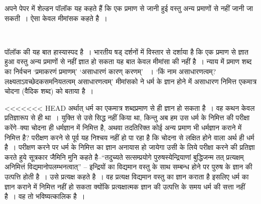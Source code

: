 अपने पेपर  में शेल्डन पॉलॉक यह कहते हैं कि एक प्रमाण से जानी हुई वस्तु अन्य प्रमाणों से नहीं जानी जा सकती~। ऐसा केवल मीमांसक कहते है~।

\begin{myquote}

~\hfill {}
\end{myquote}

पॉलॉक की यह बात हास्यास्पद है~। भारतीय षड् दर्शनों में विस्तार से दर्शाया है कि एक प्रमाण से ज्ञात हुआ वस्तु अन्य प्रमाणों से नहीं ज्ञात हो सकता यह बात केवल मीमांसा की नहीं है~। न्याय में प्रमाण शब्द का निर्वचन ‘प्रमाकरणं प्रमाणम्' ‘असाधारणं कारण् करणम्' ~। ‘किं नाम असाधारणत्वम्? लक्ष्यताऽवच्छेदकसमनियतत्वम् असाधारणत्वम्' मीमांसको ने धर्म के ज्ञान होने में असाधारण निमित्त एकमात्र चोदना (वैदिक शब्द) को बताया है~।

<<<<<<< HEAD
अर्थात् धर्म का एकमात्र शब्दप्रमाण से ही ज्ञान हो सकता है~। वह कथन केवल प्रतिज्ञारूप से ही था~। युक्ति से उसे सिद्ध नहीं किया था, किन्तु अब हम उस धर्म के निमित्त की परीक्षा करेंगे–क्या चोदना ही धर्मज्ञान में निमित्त है, अथवा तदतिरिक्त कोई अन्य प्रमाण भी धर्मज्ञान कराने में निमित्त है? परीक्षण करने से पूर्व यह निश्चय नहीं हो पा रहा है कि चोदना से लक्षित होने वाला अर्थ ही धर्म है~। परीक्षण करने पर धर्म के निमित्त का ज्ञान अनायास हो जायेगा उसी के लिये परीक्षा करने की प्रतिज्ञा करते हुये सूत्रकार जैमिनि मुनि कहते है–“तदुच्यते सत्सम्प्रयोगे पुरुषस्येन्द्रियाणां बुद्धिजन्म तत् प्रत्यक्षम् अनिमित्तं विद्यमानोपलम्भनत्वात्” – इन्द्रियों का विद्यमान वस्तु के साथ सम्बन्ध होने पर पुरुष के ज्ञान की उत्पत्ति होती है~। उसे प्रत्यक्ष कहते है~। वह प्रत्यक्ष विद्यमान वस्तु का ज्ञान कराता है इसलिए धर्म का ज्ञान कराने में निमित्त नहीं हो सकता क्योंकि प्रत्यक्षात्मक ज्ञान की उत्पत्ति के समय धर्म की सत्ता नहीं है~। वह तो भविष्यत्कालिक है~।

